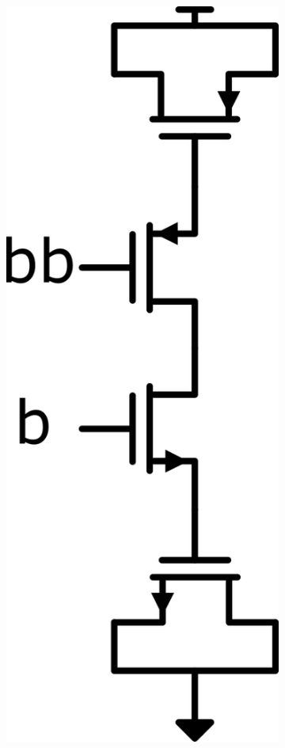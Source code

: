 \begin{figure}[htbp]
  \hfill
  \begin{subfigure}[b]{0.1\linewidth}
    \centering
    \includegraphics[width=\linewidth]{figures/Schematics/2P2N_cap.png}

\end{subfigure}
\end{figure}
